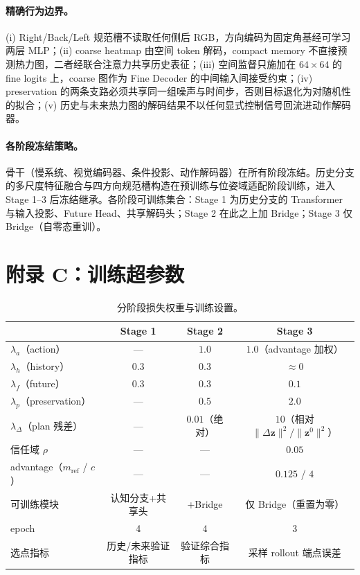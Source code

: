 \documentclass[10pt]{ctexart}
\begin{document}
\paragraph{精确行为边界。}
(i) Right/Back/Left 规范槽不读取任何侧后 RGB，方向编码为固定角基经可学习两层 MLP；(ii) coarse heatmap 由空间 token 解码，compact memory 不直接预测热力图，二者经联合注意力共享历史表征；(iii) 空间监督只施加在 $64\times64$ 的 fine logits 上，coarse 图作为 Fine Decoder 的中间输入间接受约束；(iv) preservation 的两条支路必须共享同一组噪声与时间步，否则目标退化为对随机性的拟合；(v) 历史与未来热力图的解码结果不以任何显式控制信号回流进动作解码器。

\paragraph{各阶段冻结策略。}
骨干（慢系统、视觉编码器、条件投影、动作解码器）在所有阶段冻结。历史分支的多尺度特征融合与四方向规范槽构造在预训练与位姿域适配阶段训练，进入 Stage 1--3 后冻结继承。各阶段可训练集合：Stage 1 为历史分支的 Transformer 与输入投影、Future Head、共享解码头；Stage 2 在此之上加 Bridge；Stage 3 仅 Bridge（自零态重训）。

\section*{附录 C：训练超参数}

\begin{table}[h]
\centering
\small
\begin{tabular}{lccc}
\toprule
 & Stage 1 & Stage 2 & Stage 3 \\
\midrule
$\lambda_a$（action） & --- & $1.0$ & $1.0$（advantage 加权） \\
$\lambda_h$（history） & $0.3$ & $0.3$ & $\approx0$ \\
$\lambda_f$（future） & $0.3$ & $0.3$ & $0.1$ \\
$\lambda_p$（preservation） & --- & $0.5$ & $2.0$ \\
$\lambda_{\Delta}$（plan 残差） & --- & $0.01$（绝对） & $10$（相对 $\|\Delta\mathbf{z}\|^2/\|\mathbf{z}^0\|^2$） \\
信任域 $\rho$ & --- & --- & $0.05$ \\
advantage（$m_{\mathrm{ref}}$ / $c$） & --- & --- & $0.125$ / $4$ \\
可训练模块 & 认知分支+共享头 & +Bridge & 仅 Bridge（重置为零） \\
epoch & 4 & 4 & 3 \\
选点指标 & 历史/未来验证指标 & 验证综合指标 & 采样 rollout 端点误差 \\
\bottomrule
\end{tabular}
\caption{分阶段损失权重与训练设置。}
\label{tab:hparams}
\end{table}
\end{document}
